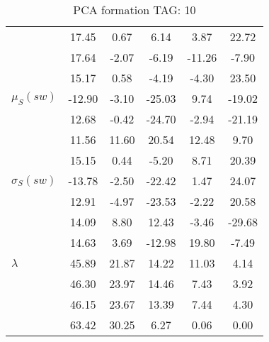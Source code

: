 \begin{table}[h!]
\begin{center}
\begin{tabular}{| l || c | c | c | c | c |}
 & 17.45  & 0.67  & 6.14  & 3.87  & 22.72 \\
 & 17.64  & -2.07  & -6.19  & -11.26  & -7.90 \\
 & 15.17  & 0.58  & -4.19  & -4.30  & 23.50 \\\hline
$\mu_S(sw)$ & -12.90  & -3.10  & -25.03  & 9.74  & -19.02 \\
 & 12.68  & -0.42  & -24.70  & -2.94  & -21.19 \\
 & 11.56  & 11.60  & 20.54  & 12.48  & 9.70 \\
 & 15.15  & 0.44  & -5.20  & 8.71  & 20.39 \\\hline
$\sigma_S(sw)$ & -13.78  & -2.50  & -22.42  & 1.47  & 24.07 \\
 & 12.91  & -4.97  & -23.53  & -2.22  & 20.58 \\
 & 14.09  & 8.80  & 12.43  & -3.46  & -29.68 \\
 & 14.63  & 3.69  & -12.98  & 19.80  & -7.49 \\\hline\hline
$\lambda$ & 45.89  & 21.87  & 14.22  & 11.03  & 4.14 \\
 & 46.30  & 23.97  & 14.46  & 7.43  & 3.92 \\
 & 46.15  & 23.67  & 13.39  & 7.44  & 4.30 \\
 & 63.42  & 30.25  & 6.27  & 0.06  & 0.00 \\\hline
\end{tabular}
\caption{PCA formation TAG: 10}
\end{center}
\end{table}
